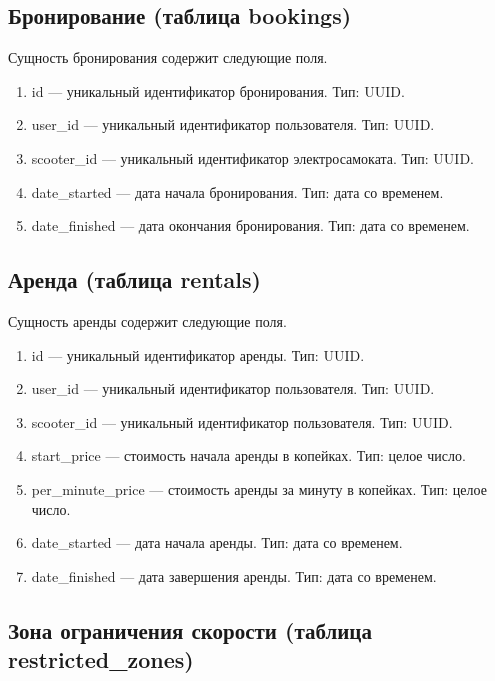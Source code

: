 \subsection{Бронирование (таблица bookings)}

Сущность бронирования содержит следующие поля.

\begin{enumerate}
    \item id --- уникальный идентификатор бронирования. Тип: UUID.
    \item user\_id --- уникальный идентификатор пользователя. Тип: UUID.
    \item scooter\_id --- уникальный идентификатор электросамоката. Тип: UUID.
    \item date\_started --- дата начала бронирования. Тип: дата со временем.
    \item date\_finished --- дата окончания бронирования. Тип: дата со временем.
\end{enumerate}

\subsection{Аренда (таблица rentals)}

Сущность аренды содержит следующие поля.

\begin{enumerate}
    \item id --- уникальный идентификатор аренды. Тип: UUID.
    \item user\_id --- уникальный идентификатор пользователя. Тип: UUID.
    \item scooter\_id --- уникальный идентификатор пользователя. Тип: UUID.
    \item start\_price --- стоимость начала аренды в копейках. Тип: целое число.
    \item per\_minute\_price --- стоимость аренды за минуту в копейках. Тип: целое число.
    \item date\_started --- дата начала аренды. Тип: дата со временем.
    \item date\_finished --- дата завершения аренды. Тип: дата со временем.
\end{enumerate}

\subsection{Зона ограничения скорости (таблица restricted\_zones)}

